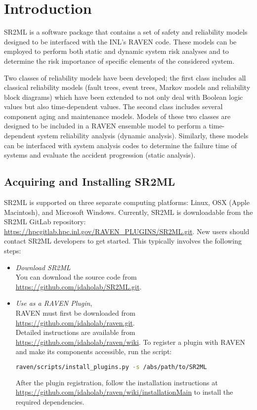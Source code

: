 \section{Introduction}
\label{sec:Introduction}

SR2ML is a software package that contains a set of safety and reliability models
designed to be interfaced with the INL's RAVEN code. These models can be
employed to perform both static and dynamic system risk analyses and to determine
the risk importance of specific elements of the considered system.

Two classes of reliability models have been developed; the first class includes
all classical reliability models (fault trees, event trees, Markov models and
reliability block diagrams) which have been extended to not only deal with
Boolean logic values but also time-dependent values. The second class includes
several component aging and maintenance models. Models of these two classes are designed to
be included in a RAVEN ensemble model to perform a time-dependent system reliability
analysis (dynamic analysis). Similarly, these models can be interfaced with system
analysis codes  to determine the failure time of systems and evaluate the accident progression
(static analysis).

\subsection{Acquiring and Installing SR2ML}
SR2ML is supported on three separate computing platforms: Linux, OSX (Apple Macintosh), and Microsoft
Windows. Currently, SR2ML is downloadable from the SR2ML GitLab repository:
\url{https://hpcgitlab.hpc.inl.gov/RAVEN_PLUGINS/SR2ML.git}. New users should contact SR2ML developers to
get started. This typically involves the following steps:

\begin{itemize}
  \item \textit{Download SR2ML}
    \\ You can download the source code from \url{https://github.com/idaholab/SR2ML.git}.
	\item \textit{Use as a RAVEN Plugin},
    \\RAVEN must first be downloaded from \url{https://github.com/idaholab/raven.git}.
		\\ Detailed instructions are available from \url{https://github.com/idaholab/raven/wiki}.
    To register a plugin with RAVEN and make its components accessible, run the script:
\begin{lstlisting}[language=bash]
raven/scripts/install_plugins.py -s /abs/path/to/SR2ML
\end{lstlisting}
    After the plugin registration, follow the installation instructions at
    \url{https://github.com/idaholab/raven/wiki/installationMain} to install the
    required dependencies.
\end{itemize}

